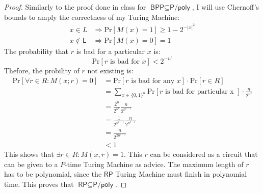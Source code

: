 \documentclass[letterpaper,11pt]{article}
\newcommand{\cc}[1]{\ensuremath{\textsf{#1}}\xspace}
\renewcommand{\L}{\cc{L}}
\newcommand{\Ppoly}{\cc{P/poly}}
\newcommand{\BPP}{\cc{BPP}}
\newcommand{\RP}{\cc{RP}}
\newcommand{\Prob}{\mbox{Pr}}
\newcommand{\tm}{Turing Machine}
\begin{document}
\begin{proof}
Similarly to the proof done in class for $\BPP \subseteq \Ppoly$, I will use Chernoff's bounds to amply the correctness of my \tm{}:
\begin{align*}
	x \in L &\Rightarrow \Prob[M(x)=1] \geq 1-2^{{-|x|}^2} \\
	x \not \in \L &\Rightarrow \Prob[M(x) = 0] = 1
\end{align*}
%
The probability that $r$ is bad for a particular $x$ is:
\[
	\Prob[r \mbox{ is bad for } x] < 2^{-n^c}
\]
%
Thefore, the probility of $r$ not existing is:
%
\begin{align*}
	\Prob [\forall r \in R : M(x;r) = 0] &= \Prob[r \mbox{ is bad for any } x] \cdot \Prob[r \in R] \\
		&= \sum_{x \in \{0,1\}^n} \Prob[r \mbox{ is bad for particular x }] \cdot \frac{n}{2^{n^c}} \\
		&= \frac{2^n}{2^{n^c}} \frac{n}{2^{n^{c-1}}} \\
		&= \frac{1}{2^{n^{c-1}}} \frac{n}{2^{n^{c-1}}} \\
		&= \frac{n}{2^{2n^{c-1}}} \\
		&< 1
\end{align*}
This shows that $\exists r \in R: M(x,r) = 1$.
This $r$ can be considered as a circuit that can be given to a $P$-time \tm{} as advice.
The maximum length of $r$ has to be polynomial, since the $\RP$ \tm{} must finish in polynomial time.
This proves that $\RP \subseteq \Ppoly$.
\end{proof}
\end{document}
